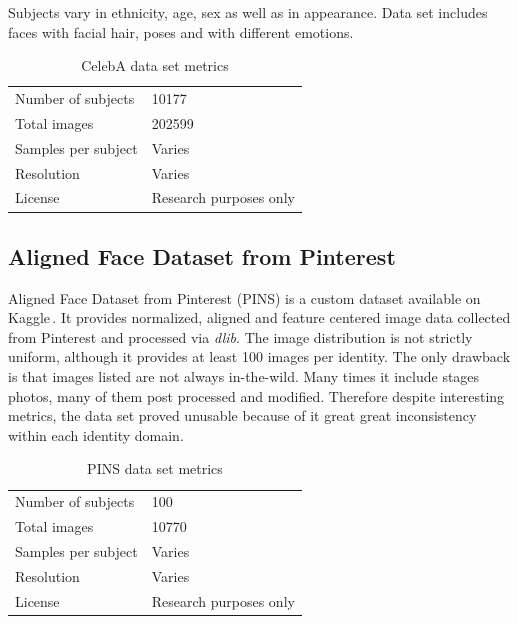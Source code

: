 Subjects vary in ethnicity, age, sex as well as in appearance. Data set includes faces with facial hair, poses and with different emotions.

\begin{table}[ht]
    \centering
    \begin{tabularx}{.8\textwidth}{l|X}
        \toprule
        Number of subjects & \num{10177} \\
        Total images & \num{202599} \\
        Samples per subject & Varies \\
        Resolution & Varies \\
        License & Research purposes only \\
        \bottomrule
    \end{tabularx}
    \caption{CelebA data set metrics}
\end{table}

\subsection{Aligned Face Dataset from Pinterest}
\label{ss:pins}

Aligned Face Dataset from Pinterest (PINS) is a custom dataset available on Kaggle\,\cite{pins}. It provides normalized, aligned and feature centered image data collected from Pinterest and processed via \textit{dlib}. The image distribution is not strictly uniform, although it provides at least 100 images per identity. The only drawback is that images listed are not always in-the-wild. Many times it include stages photos, many of them post processed and modified. Therefore despite interesting metrics, the data set proved unusable because of it great great inconsistency within each identity domain.

\begin{table}[ht]
    \centering
    \begin{tabularx}{.8\textwidth}{l|X}
        \toprule
        Number of subjects & \num{100} \\
        Total images & \num{10770} \\
        Samples per subject & Varies \\
        Resolution & Varies \\
        License & Research purposes only \\
        \bottomrule
    \end{tabularx}
    \caption{PINS data set metrics}
\end{table}
